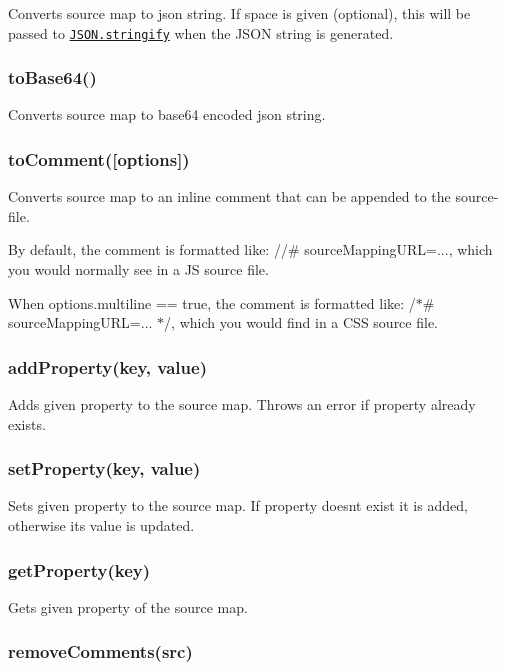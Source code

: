 Converts source map to json string. If {\ttfamily space} is given (optional), this will be passed to \href{https://developer.mozilla.org/en-US/docs/JavaScript/Reference/Global_Objects/JSON/stringify}{\tt J\+S\+O\+N.\+stringify} when the J\+S\+ON string is generated.

\subsubsection*{to\+Base64()}

Converts source map to base64 encoded json string.

\subsubsection*{to\+Comment(\mbox{[}options\mbox{]})}

Converts source map to an inline comment that can be appended to the source-\/file.

By default, the comment is formatted like\+: {\ttfamily //\# source\+Mapping\+U\+RL=...}, which you would normally see in a JS source file.

When {\ttfamily options.\+multiline == true}, the comment is formatted like\+: {\ttfamily /$\ast$\# source\+Mapping\+U\+RL=... $\ast$/}, which you would find in a C\+SS source file.

\subsubsection*{add\+Property(key, value)}

Adds given property to the source map. Throws an error if property already exists.

\subsubsection*{set\+Property(key, value)}

Sets given property to the source map. If property doesn\textquotesingle{}t exist it is added, otherwise its value is updated.

\subsubsection*{get\+Property(key)}

Gets given property of the source map.

\subsubsection*{remove\+Comments(src)}

